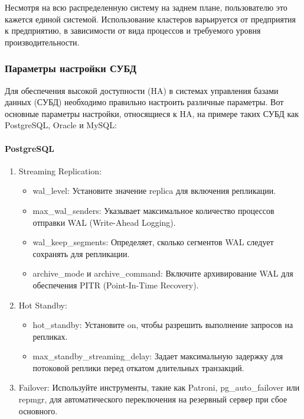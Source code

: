 Несмотря на всю распределенную систему на заднем плане, пользователю это кажется единой системой. Использование кластеров варьируется от предприятия к предприятию, в зависимости от вида процессов и требуемого уровня производительности.
\subsubsection{Параметры настройки СУБД}
Для обеспечения высокой доступности (HA) в системах управления базами данных (СУБД) необходимо правильно настроить различные параметры. Вот основные параметры настройки, относящиеся к HA, на примере таких СУБД как PostgreSQL, Oracle и MySQL:
\paragraph{PostgreSQL} \cite{availability-postgres}
\begin{enumerate}
    \item Streaming Replication:
    \begin{itemize}
        \item wal\_level: Установите значение replica для включения репликации.
        \item max\_wal\_senders: Указывает максимальное количество процессов отправки WAL (Write-Ahead Logging).
        \item wal\_keep\_segments: Определяет, сколько сегментов WAL следует сохранять для репликации.
        \item archive\_mode и archive\_command: Включите архивирование WAL для обеспечения PITR (Point-In-Time Recovery).
    \end{itemize}
    \item Hot Standby:
    \begin{itemize}
        \item hot\_standby: Установите on, чтобы разрешить выполнение запросов на репликах.
        \item max\_standby\_streaming\_delay: Задает максимальную задержку для потоковой реплики перед откатом длительных транзакций.
    \end{itemize}
    \item Failover: Используйте инструменты, такие как Patroni, pg\_auto\_failover или repmgr, для автоматического переключения на резервный сервер при сбое основного.
\end{enumerate}
